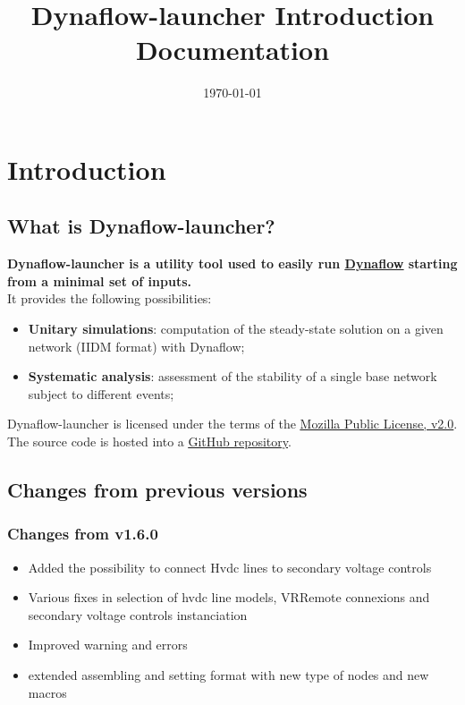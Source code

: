 \documentclass[a4paper, 12pt]{report}
\begin{document}
\title{Dynaflow-launcher Introduction Documentation}
\date\today

\maketitle
\tableofcontents

\chapter{Introduction}

\section{What is Dynaflow-launcher?}

\textbf{Dynaflow-launcher is a utility tool used to easily run \href{https://dynawo.github.io/about/dynaflow}{\underline{Dynaflow}}
starting from a minimal set of inputs.} \\

It provides the following possibilities:
\begin{itemize}
  \item \textbf{Unitary simulations}: computation of the steady-state solution on a given network (IIDM format) with Dynaflow;
  \item \textbf{Systematic analysis}: assessment of the stability of a single base network subject to different events;
\end{itemize}

Dynaflow-launcher is licensed under the terms of the \href{http://mozilla.org/MPL/2.0}{\underline{Mozilla Public License, v2.0}}.
The source code is hosted into a \href{https://github.com/dynawo/dynaflow-launcher} {\underline{GitHub repository}}. \\

\section{Changes from previous versions}
\subsection{Changes from v1.6.0}

\begin{itemize}
\item Added the possibility to connect Hvdc lines to secondary voltage controls
\item Various fixes in selection of hvdc line models, VRRemote connexions and secondary voltage controls instanciation
\item Improved warning and errors
\item extended assembling and setting format with new type of nodes and new macros
\end{itemize}
\end{document}
